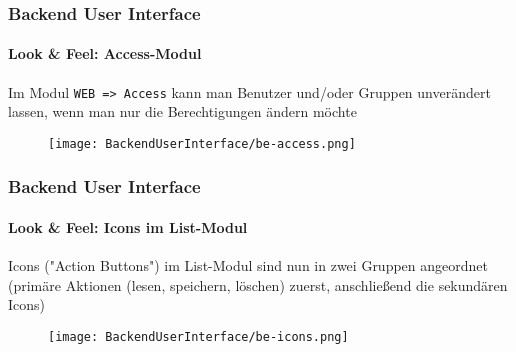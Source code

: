 
\begin{frame}[fragile]
	\frametitle{Backend User Interface}
	\framesubtitle{Look \& Feel: Access-Modul}

	Im Modul \texttt{WEB => Access} kann man Benutzer und/oder Gruppen unverändert
	lassen, wenn man nur die Berechtigungen ändern möchte

	\begin{figure}
		\texttt{[image: BackendUserInterface/be-access.png]}
	\end{figure}

\end{frame}


\begin{frame}[fragile]
	\frametitle{Backend User Interface}
	\framesubtitle{Look \& Feel: Icons im List-Modul}

	Icons ("Action Buttons") im List-Modul sind nun in zwei Gruppen angeordnet\newline
	\smaller(primäre Aktionen (lesen, speichern, löschen) zuerst, anschließend die sekundären Icons)

	\begin{figure}
		\texttt{[image: BackendUserInterface/be-icons.png]}
	\end{figure}

\end{frame}

